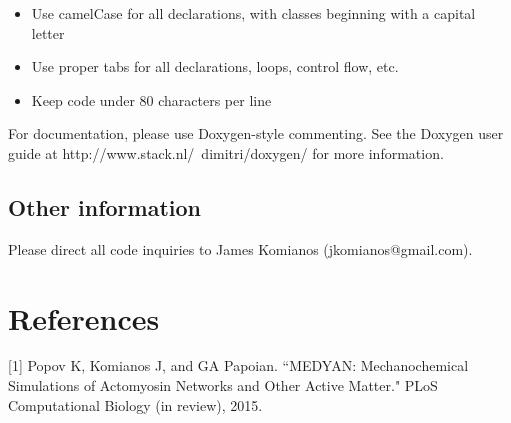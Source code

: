 \documentclass[11pt, oneside]{article}   	%
\begin{document}
\begin{itemize}

\item Use camelCase for all declarations, with classes beginning with a capital letter
\item Use proper tabs for all declarations, loops, control flow, etc.
\item Keep code under 80 characters per line

\end{itemize}

\noindent For documentation, please use Doxygen-style commenting. See the Doxygen user guide at 
http://www.stack.nl/~dimitri/doxygen/ for more information.

\subsection{Other information}

Please direct all code inquiries to James Komianos (jkomianos@gmail.com).

\section{References}

[1] Popov K, Komianos J, and GA Papoian. ``MEDYAN: Mechanochemical Simulations 
\indent of Actomyosin Networks and Other Active Matter." PLoS Computational Biology (in 
\indent review), 2015.
\end{document}
